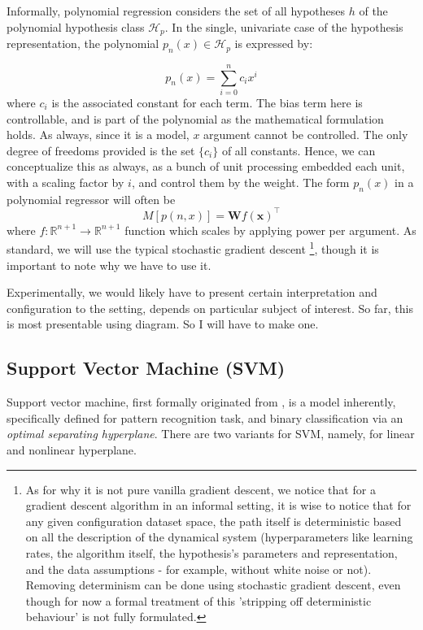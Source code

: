 Informally, polynomial regression considers the set of all hypotheses $h$ of the polynomial hypothesis class $\mathcal{H}_{p}$. In the single, univariate case of the hypothesis representation, the polynomial $p_{n}(x)\in \mathcal{H}_{p}$ is expressed by: 

\begin{equation*}
    p_{n}(x)=\sum^{n}_{i=0}c_{i}x^{i}
\end{equation*}
where $c_{i}$ is the associated constant for each term. The bias term here is controllable, and is part of the polynomial as the mathematical formulation holds. As always, since it is a model, $x$ argument cannot be controlled. The only degree of freedoms provided is the set $\{ c_{i} \}$ of all constants. Hence, we can conceptualize this as always, as a bunch of unit processing embedded each unit, with a scaling factor by $i$, and control them by the weight. The form $p_{n}(x)$ in a polynomial regressor will often be $$M[p(n,x)]=\mathbf{W}f(\mathbf{x})^{\top}$$
where $f:\mathbb{R}^{n+1}\to \mathbb{R}^{n+1}$ function which scales by applying power per argument. As standard, we will use the typical stochastic gradient descent \footnote{As for why it is not pure vanilla gradient descent, we notice that for a gradient descent algorithm in an informal setting, it is wise to notice that for any given configuration dataset space, the path itself is deterministic based on all the description of the dynamical system (hyperparameters like learning rates, the algorithm itself, the hypothesis's parameters and representation, and the data assumptions - for example, without white noise or not). Removing determinism can be done using stochastic gradient descent, even though for now a formal treatment of this 'stripping off deterministic behaviour' is not fully formulated. }, though it is important to note why we have to use it. 

Experimentally, we would likely have to present certain interpretation and configuration to the setting, depends on particular subject of interest. So far, this is most presentable using diagram. So I will have to make one. 

\subsection{Support Vector Machine (SVM)}

Support vector machine, first formally originated from \cite{Vapnik1999-VAPTNO}, is a model inherently, specifically defined for pattern recognition task, and binary classification via an \textit{optimal separating hyperplane}. There are two variants for SVM, namely, for linear and nonlinear hyperplane. 

